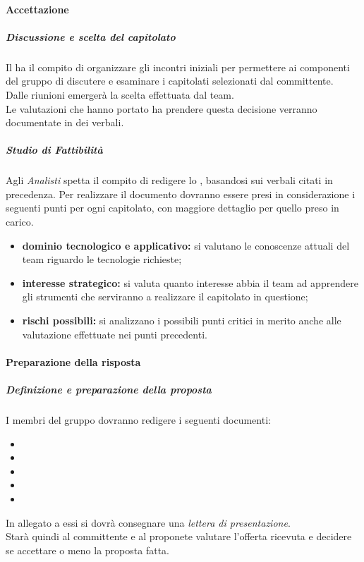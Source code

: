 			\paragraph{Accettazione}
				\subparagraph{Discussione e scelta del capitolato}
Il \roleProjectManager{} ha il compito di organizzare	gli incontri iniziali per permettere ai componenti del gruppo di discutere e esaminare i capitolati selezionati dal committente. \\
Dalle riunioni emergerà la scelta effettuata dal team. \\
Le valutazioni che hanno portato ha prendere questa decisione verranno documentate in dei verbali.
				\subparagraph{Studio di Fattibilità}
Agli \emph{Analisti} spetta il compito di redigere lo \docNameVersionSdF{}, basandosi sui verbali citati in precedenza.
Per realizzare il documento dovranno essere presi in considerazione i seguenti punti per ogni capitolato, con maggiore dettaglio per quello preso in carico.
					\begin{itemize}
						\item \textbf{dominio tecnologico e applicativo:} si valutano le conoscenze attuali del team riguardo le tecnologie richieste;
						\item \textbf{interesse strategico:} si valuta quanto interesse abbia il team ad apprendere gli strumenti che serviranno a realizzare il capitolato in questione;
						\item \textbf{rischi possibili:} si analizzano i possibili punti critici in merito anche alle valutazione effettuate nei punti precedenti.
					\end{itemize}
			\paragraph{Preparazione della risposta}
				\subparagraph{Definizione e preparazione della proposta}
I membri del gruppo \groupName{} dovranno redigere i seguenti documenti: \\
					\begin{itemize}
						\item \docNameVersionSdF
						\item \docNameVersionAdR
						\item \docNameVersionPdP
						\item \docNameVersionPdQ
						\item \docNameVersionNdP
					\end{itemize}
In allegato a essi si dovrà consegnare una \emph{lettera di presentazione}. \\
Starà quindi al committente e al proponete valutare l'offerta ricevuta e decidere se accettare o meno la proposta fatta.
					

